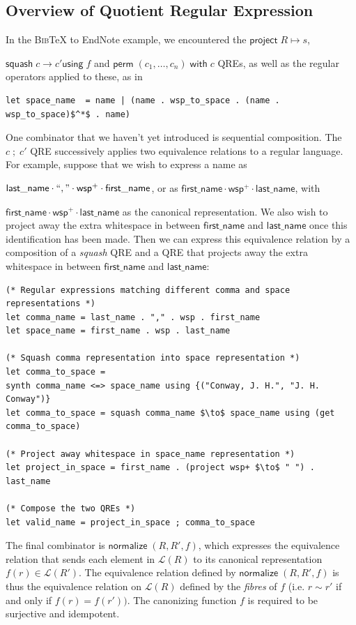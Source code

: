 \documentclass[acmsmall,review,anonymous]{acmart}\settopmatter{printfolios=true,printccs=false,printacmref=false}
\newcommand{\kw}[1]{\ensuremath{\mathsf{#1}}}
\newcommand{\project}[2]{\ensuremath{\kw{project} \; #1 \mapsto #2}}
\newcommand{\squash}[3]{\ensuremath{\kw{squash} \; #1 \rightarrow #2
\kw{using} \; #3}}
\newcommand{\perm}[2]{\ensuremath{\kw{perm}\; (#1)\; \kw{with}\; #2}}
\newcommand{\normalize}[3]{\ensuremath{\kw{normalize} \; (#1, #2, #3)}}
\newcommand{\bibtex}{\textsc{Bib}\TeX{}}
\newcommand{\semicolon}{\ensuremath{\; ; \;}}
\begin{document}
\subsection{Overview of Quotient Regular Expression}
In the \bibtex{} to EndNote example, we encountered the $\project{R}{s}$,

\noindent $\squash{c}{c'}{f}$ and $\perm{c_1, \ldots, c_n}{c}$ QREs, as well as
the regular operators applied to these, as in

\begin{lstlisting}
let space_name  = name | (name . wsp_to_space . (name . wsp_to_space)$^*$ . name)
\end{lstlisting}

One combinator that we haven't yet introduced is sequential composition.
The $c \semicolon c'$ QRE successively applies
two equivalence relations to a regular language. For example, suppose that
we wish to express a name as

\noindent $\kw{last\_name \cdot ``,\text{''} \cdot wsp^+ \cdot first\_name}$,
or as $\kw{first\_name\cdot wsp^+ \cdot last\_name}$, with

\noindent $\kw{first\_name\cdot wsp^+ \cdot last\_name}$ as the canonical
representation. We also wish to project away the extra whitespace in between
\kw{first\_name} and \kw{last\_name} once this identification has been made.
Then we can express this equivalence relation by a composition of a
\textit{squash} QRE and a QRE that projects away the extra whitespace in between
\kw{first\_name} and \kw{last\_name}:


\begin{lstlisting}
(* Regular expressions matching different comma and space representations *)
let comma_name = last_name . "," . wsp . first_name
let space_name = first_name . wsp . last_name

(* Squash comma representation into space representation *)
let comma_to_space =
synth comma_name <=> space_name using {("Conway, J. H.", "J. H. Conway")}
let comma_to_space = squash comma_name $\to$ space_name using (get comma_to_space)

(* Project away whitespace in space_name representation *)
let project_in_space = first_name . (project wsp+ $\to$ " ") . last_name

(* Compose the two QREs *)
let valid_name = project_in_space ; comma_to_space
\end{lstlisting}

The final combinator is $\normalize{R}{R'}{f}$, which expresses
the equivalence relation that sends each element in $\mathcal{L}(R)$ to its
canonical representation $f(r) \in \mathcal{L}(R')$. The equivalence relation
defined by $\normalize{R}{R'}{f}$ is thus the equivalence relation on
$\mathcal{L}(R)$ defined by the {\em fibres} of $f$ (i.e. $r \sim r'$ if and
only if $f(r) = f(r'))$. The canonizing function $f$ is required to be
surjective and idempotent.
\end{document}
